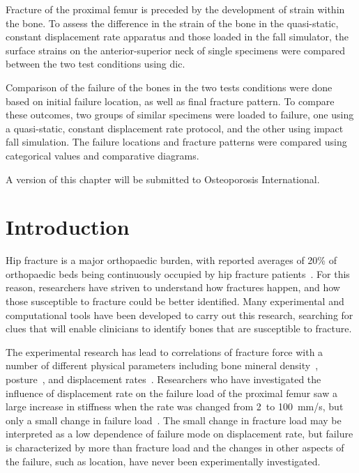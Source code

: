 Fracture of the proximal femur is preceded by the development of strain within the bone.
To assess the difference in the strain of the bone in the quasi-static, constant displacement rate apparatus and those loaded in the fall simulator, the surface strains on the anterior-superior neck of single specimens were compared between the two test conditions using \acf{dic}.

Comparison of the failure of the bones in the two tests conditions were done based on initial failure location, as well as final fracture pattern.
To compare these outcomes, two groups of similar specimens were loaded to failure, one using a quasi-static, constant displacement rate protocol, and the other using impact fall simulation.
The failure locations and fracture patterns were compared using categorical values and comparative diagrams.

A version of this chapter will be submitted to Osteoporosis International. 

\section{Introduction}
Hip fracture is a major orthopaedic burden, with reported averages of 20\% of orthopaedic beds being continuously occupied by hip fracture patients~\citep{lyritis_epidemiology_1992, borissova_femoral_2011}.
For this reason, researchers have striven to understand how fractures happen, and how those susceptible to fracture could be better identified.
Many experimental and computational tools have been developed to carry out this research, searching for clues that will enable clinicians to identify bones that are susceptible to fracture.

The experimental research has lead to correlations of fracture force with a number of different physical parameters including bone mineral density~\citep{boehm_prediction_2008, de_bakker_during_2009, lochmuller_mechanical_2002}, posture~\citep{pinilla_impact_1996, ford_effect_1996}, and displacement rates~\citep{courtney_effects_1994, weber_proximal_1992, gilchrist_mechanics_2013}.
Researchers who have investigated the influence of displacement rate on the failure load of the proximal femur saw a large increase in stiffness when the rate was changed from 2~to 100~\ac{mm}/\ac{s}, but only a small change in failure load~\citep{courtney_effects_1994}.
The small change in fracture load may be interpreted as a low dependence of failure mode on displacement rate, but failure is characterized by more than fracture load and the changes in other aspects of the failure, such as location, have never been experimentally investigated.

